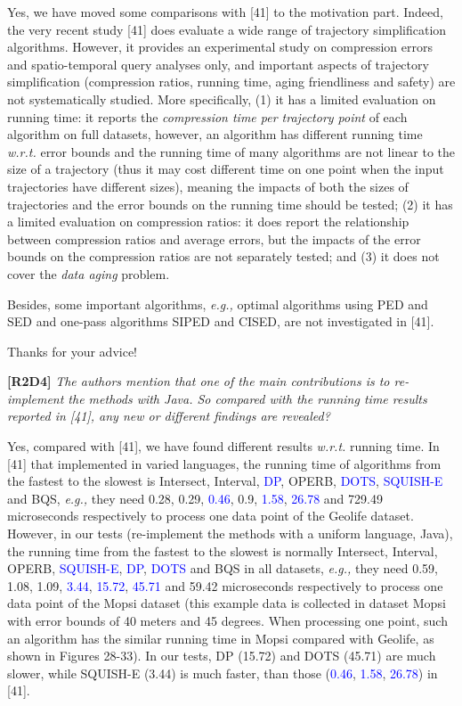 \documentclass{letter}
\newcommand{\eg}{\emph{e.g.,}\xspace}
\newcommand{\wrt}{\emph{w.r.t.}\xspace}
\begin{document}
{Yes, we have moved some comparisons with [41] to the motivation part. Indeed, the very recent study [41] does evaluate a wide range of trajectory simplification algorithms.
However, it provides {an experimental study} on compression errors and spatio-temporal query analyses only, and important aspects of trajectory simplification (compression ratios, running time, aging friendliness and safety) are not systematically studied. 
{More specifically,}
{(1) it has a limited evaluation on running time: it reports the \emph{compression time per trajectory point} of each algorithm on full datasets, however, an algorithm has different running time \wrt error bounds and the running time of many algorithms are not linear to the size of a trajectory (thus it may cost different time on one point when the input trajectories have different sizes), meaning the impacts of both the sizes of trajectories and the error bounds on the running time should be tested;}
%
{(2) it has a limited evaluation on compression ratios: it does report the relationship between compression ratios and average errors, but the impacts of the error bounds on the compression ratios are not separately tested; and }
%
(3) it does not cover the \emph{data aging} problem.
%
{Besides, some important algorithms, \eg optimal algorithms using PED and SED and one-pass algorithms SIPED and CISED, are not investigated in [41]. 
%


Thanks for your advice!

\textbf{[R2D4]} \emph{The authors mention that one of the main contributions is to re-implement the methods with Java. So compared with the running time results reported in [41], any new or different findings are revealed?}


Yes, compared with [41], we have found different results \wrt running time. 
In [41] that implemented in varied languages, the running time of algorithms from the fastest to the slowest is Intersect, Interval, \textcolor{blue}{DP}, OPERB, \textcolor{blue}{DOTS}, \textcolor{blue}{SQUISH-E} and BQS, \eg they need 0.28, 0.29, \textcolor{blue}{0.46}, 0.9, \textcolor{blue}{1.58}, \textcolor{blue}{26.78} and 729.49 microseconds respectively to process one data point of the Geolife dataset.
However, in our tests (re-implement the methods with a uniform language, Java), the running time from the fastest to the slowest is normally Intersect, Interval, OPERB, \textcolor{blue}{SQUISH-E}, \textcolor{blue}{DP},  \textcolor{blue}{DOTS} and BQS in all datasets, \eg they need 0.59, 1.08, 1.09, \textcolor{blue}{3.44}, \textcolor{blue}{15.72}, \textcolor{blue}{45.71} and 59.42 microseconds respectively to process one data point of the Mopsi dataset (this example data is collected in dataset Mopsi with error bounds of 40 meters and 45 degrees. When processing one point, such an algorithm has the similar running time in Mopsi compared with Geolife, as shown in Figures 28-33). In our tests, DP (15.72) and DOTS (45.71) are much slower, while SQUISH-E (3.44) is much faster, than those (\textcolor{blue}{0.46}, \textcolor{blue}{1.58}, \textcolor{blue}{26.78}) in [41].


}}
\end{document}
